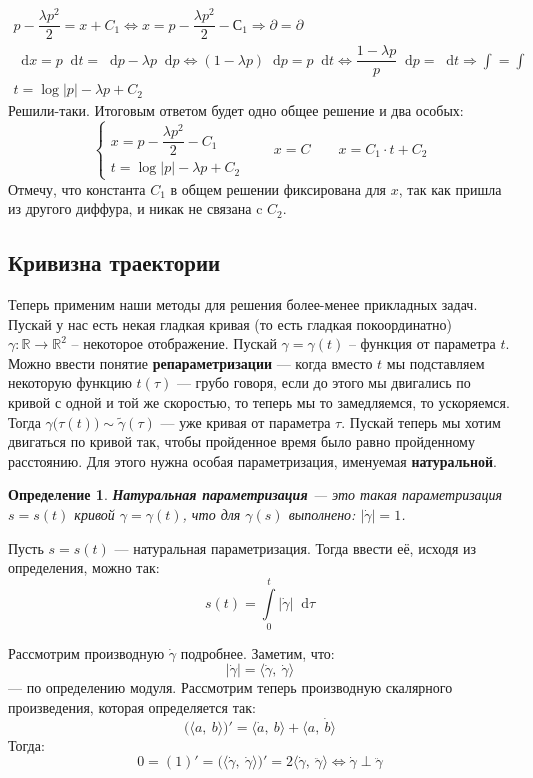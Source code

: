 \documentclass[a4paper,12pt]{article}
\newtheorem{definition}{Определение}
\newcommand{\R}{\mathbb{R}}
\renewcommand*\d{\mathop{}\!\mathrm{d}}
\renewcommand{\to}{\longrightarrow}
\newcommand{\bto}{\Longrightarrow}
\newcommand{\ds}{\displaystyle}
\begin{document}
\begin{gather*}
	p - \dfrac{\lambda p^2}{2} = x + C_1 \iff x = p - \dfrac{\lambda p^2}{2} - С_1 \bto \partial = \partial\\
	\d x = p\d t = \d p - \lambda p\d p \iff (1 - \lambda p)\d p = p\d t \iff \dfrac{1 - \lambda p}{p}\d p = \d t \bto \ds\int = \int\\
	t = \log|p| - \lambda p + C_2
\end{gather*}
Решили-таки. Итоговым ответом будет одно общее решение и два особых:
\[\begin{cases}
	x = p - \dfrac{\lambda p^2}{2} - C_1\\
	t = \log|p| - \lambda p + C_2
\end{cases} \qquad x = C \qquad x = C_1\cdot t + C_2\]
Отмечу, что константа $C_1$ в общем решении фиксирована для $x$, так как пришла из другого диффура, и никак не связана c $C_2$.

\subsection{Кривизна траектории}

Теперь применим наши методы для решения более-менее прикладных задач. Пускай у нас есть некая гладкая кривая (то есть гладкая покоординатно) $\gamma : \R \to \R^2$ -- некоторое отображение. Пускай $\gamma = \gamma(t)$ -- функция от параметра $t$. Можно ввести понятие \textbf{репараметризации} --- когда вместо $t$ мы подставляем некоторую функцию $t(\tau)$ --- грубо говоря, если до этого мы двигались по кривой с одной и той же скоростью, то теперь мы то замедляемся, то ускоряемся. Тогда $\gamma\big(\tau(t)\big) \sim \widetilde{\gamma}(\tau)$ --- уже кривая от параметра $\tau$. Пускай теперь мы хотим двигаться по кривой так, чтобы пройденное время было равно пройденному расстоянию. Для этого нужна особая параметризация, именуемая \textbf{натуральной}.
\begin{definition}
	\textbf{Натуральная параметризация} --- это такая параметризация $s = s(t)$ кривой $\gamma = \gamma(t)$, что для $\gamma(s)$ выполнено: $|\dot{\gamma}| = 1$.
\end{definition}
Пусть $s = s(t)$ --- натуральная параметризация. Тогда ввести её, исходя из определения, можно так:
\[s(t) = \ds\int\limits_{0}^t |\dot{\gamma}|\d\tau\]

Рассмотрим производную $\dot \gamma$ подробнее. Заметим, что:
\[|\dot \gamma| = \langle\dot \gamma,\ \dot \gamma\rangle\] --- по определению модуля. Рассмотрим теперь производную скалярного произведения, которая определяется так:
\[\big(\langle a,\ b\rangle\big)' = \langle \dot a,\ b\rangle + \langle a,\ \dot b\rangle\]
Тогда:
\[0 = (1)' = \big(\langle\dot \gamma,\ \dot \gamma\rangle\big)' = 2\langle \dot \gamma,\ \ddot \gamma\rangle \iff \dot \gamma \perp \ddot \gamma\]
\end{document}
